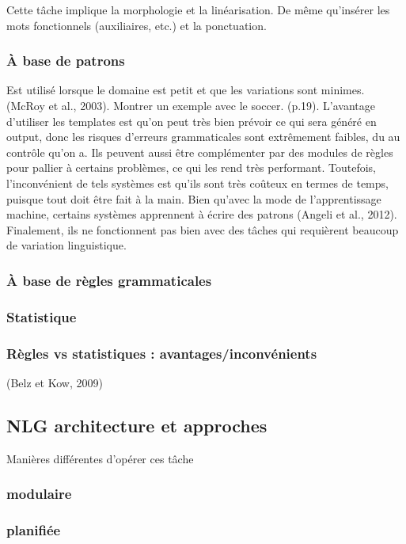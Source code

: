 Cette tâche implique la morphologie et la linéarisation. De même qu'insérer les mots fonctionnels (auxiliaires, etc.) et la ponctuation.

\subsubsection{À base de patrons}
Est utilisé lorsque le domaine est petit et que les variations sont minimes. (McRoy et al., 2003). Montrer un exemple avec le soccer. (p.19).  L'avantage d'utiliser les templates est qu'on peut très bien prévoir ce qui sera généré en output, donc les risques d'erreurs grammaticales sont extrêmement faibles, du au contrôle qu'on a. Ils peuvent aussi être complémenter par des modules de règles pour pallier à certains problèmes, ce qui les rend très performant. Toutefois, l'inconvénient de tels systèmes est qu'ils sont très coûteux en termes de temps, puisque tout doit être fait à la main. Bien qu'avec la mode de l'apprentissage machine, certains systèmes apprennent à écrire des patrons (Angeli et al., 2012). Finalement, ils ne fonctionnent pas bien avec des tâches qui requièrent beaucoup de variation linguistique.

\subsubsection{À base de règles grammaticales}


\subsubsection{Statistique}

\subsubsection{Règles vs statistiques : avantages/inconvénients}
(Belz et Kow, 2009)


\subsection{NLG architecture et approches}

Manières différentes d'opérer ces tâche

\subsubsection{modulaire}
\subsubsection{planifiée}
